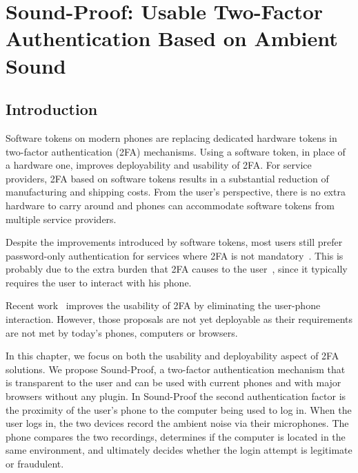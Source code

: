 \chapter[Sound-Proof: Usable 2FA Based on Ambient Sound]{Sound-Proof: Usable Two-Factor Authentication Based on Ambient Sound}
\label{chap:ps_soundproof}

\newcommand*\rot{\rotatebox{90}}
\newcommand*\OK{\ding{51}}

\section{Introduction}

Software tokens on modern phones are replacing dedicated hardware tokens in two-factor authentication (2FA) mechanisms. Using a software token, in place of a hardware one, improves deployability and usability of 2FA. For service providers, 2FA based on software tokens results in a substantial reduction of manufacturing and shipping costs.
From the user's perspective, there is no extra hardware to carry around and phones can accommodate software tokens from multiple service providers.

Despite the improvements introduced by software tokens, most users still prefer password-only authentication for services where 2FA is not mandatory~\cite{petsas15eurosec,imperi13umsurvey}.
This is probably due to the extra burden that 2FA causes to the user~\cite{gunson11cs,weir10int}, since it typically requires the user to interact with his phone.

Recent work~\cite{czeskis12ccs, shirvanian14} improves the usability of 2FA by eliminating the user-phone interaction. However, those proposals are not yet deployable as their requirements are not met by today's phones, computers or browsers.

In this chapter, we focus on both the usability and deployability aspect of 2FA solutions.
We propose Sound-Proof, a two-factor authentication mechanism that is transparent to the user and can be used with current phones and with major browsers without any plugin.
In Sound-Proof the second authentication factor is the proximity of the user's phone to the computer being used to log in.
When the user logs in, the two devices record the ambient noise via their microphones.
The phone compares the two recordings, determines if the computer is located in the same environment, and ultimately decides whether the login attempt is legitimate or fraudulent.

